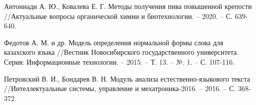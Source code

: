 \renewcommand{\bibname}{Список использованных источников}
\begin{thebibliography}{100}

Антониади А. Ю., Ковалева Е. Г. Методы получения пива повышенной крепости //Актуальные вопросы органической химии и биотехнологии. – 2020. – С. 639-640.

Федотов А. М. и др. Модель определения нормальной формы слова для казахского языка //Вестник Новосибирского государственного университета. Серия: Информационные технологии. – 2015. – Т. 13. – №. 1. – С. 107-116.

Петровский В. И., Бондарев В. Н. Модуль анализа естественно-языкового текста //Интеллектуальные системы, управление и мехатроника-2016. – 2016. – С. 368-372.




\end{thebibliography}

\newpage